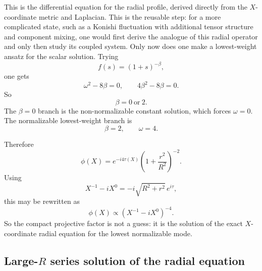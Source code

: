 \documentclass[12pt]{article}
\begin{document}
This is the differential equation for the radial profile, derived directly from the $X$-coordinate
metric and Laplacian.  This is the reusable step: for a more complicated state, such as a Konishi
fluctuation with additional tensor structure and component mixing, one would first derive the analogue
of this radial operator and only then study its coupled system.  Only now does one make a
lowest-weight ansatz for the scalar solution.  Trying
\begin{equation}
f(s)=(1+s)^{-\beta},
\end{equation}
one gets
\begin{equation}
\omega^2-8\beta=0,
\qquad
4\beta^2-8\beta=0.
\end{equation}
So
\begin{equation}
\beta=0\ \text{or}\ 2.
\end{equation}
The $\beta=0$ branch is the non-normalizable constant solution, which forces $\omega=0$.  The
normalizable lowest-weight branch is
\begin{equation}
\beta=2,
\qquad
\omega=4.
\end{equation}

Therefore
\begin{equation}
\phi(X)=e^{-i4\tau(X)}\left(1+\frac{r^2}{R^2}\right)^{-2}.
\end{equation}
Using
\begin{equation}
X^{-1}-iX^0=-i\sqrt{R^2+r^2}\,e^{i\tau},
\end{equation}
this may be rewritten as
\begin{equation}
\phi(X)\propto \left(X^{-1}-iX^0\right)^{-4}.
\end{equation}
So the compact projective factor is not a guess: it is the solution of the exact $X$-coordinate radial
equation for the lowest normalizable mode.

\subsection*{Large-$R$ series solution of the radial equation}
\end{document}

